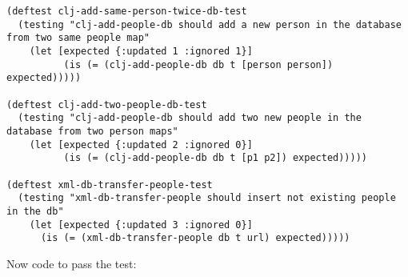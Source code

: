 \documentclass[11pt]{article}
\begin{document}
\begin{verbatim}
(deftest clj-add-same-person-twice-db-test
  (testing "clj-add-people-db should add a new person in the database from two same people map"
    (let [expected {:updated 1 :ignored 1}]
          (is (= (clj-add-people-db db t [person person]) expected)))))

(deftest clj-add-two-people-db-test
  (testing "clj-add-people-db should add two new people in the database from two person maps"
    (let [expected {:updated 2 :ignored 0}]
          (is (= (clj-add-people-db db t [p1 p2]) expected)))))

(deftest xml-db-transfer-people-test
  (testing "xml-db-transfer-people should insert not existing people in the db"
    (let [expected {:updated 3 :ignored 0}]
      (is (= (xml-db-transfer-people db t url) expected)))))          
\end{verbatim}

Now code to pass the test:
\end{document}

